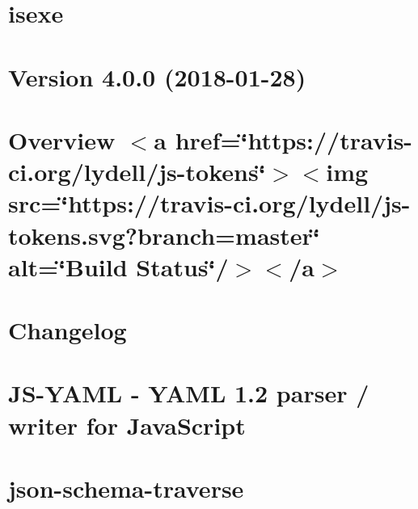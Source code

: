 \let\mypdfximage\pdfximage\def\pdfximage{\immediate\mypdfximage}\documentclass[twoside]{book}
\newcommand{\+}{\discretionary{\mbox{\scriptsize$\hookleftarrow$}}{}{}}
\begin{document}
\chapter{isexe}
\label{md_heap-visualizer_node_modules_isexe__r_e_a_d_m_e}

\chapter{Version 4.0.0 (2018-\/01-\/28)}
\label{md_heap-visualizer_node_modules_js-tokens__c_h_a_n_g_e_l_o_g}

\chapter{Overview $<$a href=\char`\"{}https\+://travis-\/ci.\+org/lydell/js-\/tokens\char`\"{}$>$$<$img src=\char`\"{}https\+://travis-\/ci.\+org/lydell/js-\/tokens.\+svg?branch=master\char`\"{} alt=\char`\"{}\+Build Status\char`\"{}/$>$$<$/a$>$}
\label{md_heap-visualizer_node_modules_js-tokens__r_e_a_d_m_e}

\chapter{Changelog}
\label{md_heap-visualizer_node_modules_js-yaml__c_h_a_n_g_e_l_o_g}

\chapter{J\+S-\/\+Y\+A\+ML -\/ Y\+A\+ML 1.2 parser / writer for Java\+Script}
\label{md_heap-visualizer_node_modules_js-yaml__r_e_a_d_m_e}

\chapter{json-\/schema-\/traverse}
\label{md_heap-visualizer_node_modules_json-schema-traverse__r_e_a_d_m_e}

\end{document}
